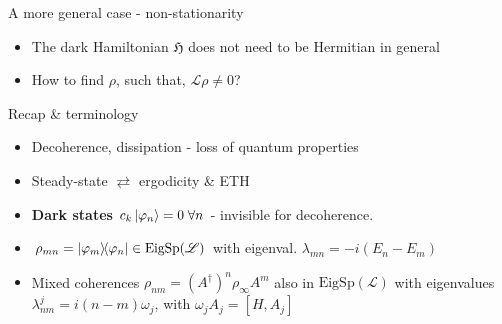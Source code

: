\documentclass[10pt,xcolor={table,dvipsnames},t]{beamer}
\newcommand{\outerprod}[2]{\ket{#1}\!\!\bra{#2}}
\begin{document}
\begin{frame}{A more general case - non-stationarity}
  \begin{itemize}
    \item<1-> The dark Hamiltonian $\mathfrak{H}$ does not need to be Hermitian in general
    \item<2-> How to find $\rho$, such that, $\mathcal{L} \rho \neq 0$?
  \end{itemize}
\end{frame}

\begin{frame}{Recap \& terminology}
  \begin{itemize}
    \item<1-> Decoherence, dissipation - loss of quantum properties 
    \item<2-> Steady-state \;$\rightleftarrows$\; ergodicity \& ETH
    \item<3-> \textbf{Dark states} $c_k\ket{\varphi_n}=0 \;\forall n$ - invisible for decoherence. 
    \item<4-> $\rho_{mn} = \outerprod{\varphi_m}{\varphi_n} \in \text{EigSp}(\mathcal{L})$ \;\; with eigenval. \;$\lambda_{mn} = -i(E_n - E_m)$
    \item<5-> Mixed coherences $\rho_{nm}= (A^\dag)^n \rho_\infty A^m$ also in $\text{EigSp}(\mathcal{L})$ with 
      eigenvalues $\lambda_{nm}^j=i(n-m)\omega_j$, with $\omega_jA_j = [H,A_j]$
  \end{itemize}
\end{frame}
\end{document}

